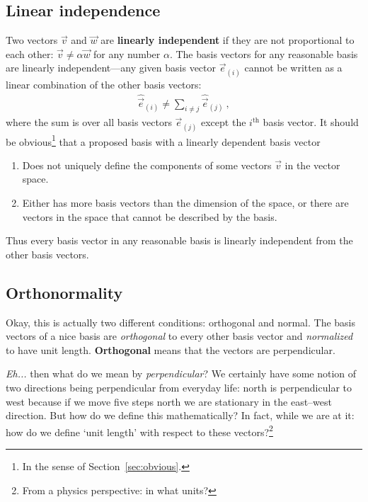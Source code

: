 \documentclass[
  11pt,
	colorful,
	raggedright,
]{tufte-style-thesis-flip}
\begin{document}
\subsection{Linear independence}

Two vectors $\vec{v}$ and $\vec{w}$ are \textbf{linearly independent} if they are not proportional to each other: $\vec{v} \neq \alpha \vec{w}$ for any number $\alpha$. The basis vectors for any reasonable basis are linearly independent---any given basis vector $\vec{e}_{(i)}$ cannot be written as a linear combination of the other basis vectors:
\begin{align}
\hat{\vec{e}}_{(i)} \neq \sum_{i\neq j}\hat{\vec{e}}_{(j)} \ ,
\end{align}
where the sum is over all basis vectors $\vec{e}_{(j)}$ except the $i^\text{th}$ basis vector. It should be obvious\footnote{In the sense of Section~\ref{sec:obvious}.} that a proposed basis with a linearly dependent basis vector
\begin{enumerate}
  \item Does not uniquely define the components of some vectors $\vec{v}$ in the vector space.
  \item Either has more basis vectors than the dimension of the space, or there are vectors in the space that cannot be described by the basis.
\end{enumerate}
Thus every basis vector in any reasonable basis is linearly independent from the other basis vectors.

\subsection{Orthonormality}

Okay, this is actually two different conditions: orthogonal and normal. The basis vectors of a nice basis are \emph{orthogonal} to every other basis vector and \emph{normalized} to have unit length. \textbf{Orthogonal} means that the vectors are perpendicular. 

\emph{Eh...} then what do we mean by \emph{perpendicular}? We certainly have some notion of two directions being perpendicular from everyday life: north is perpendicular to west because if we move five steps north we are stationary in the east--west direction. But how do we define this mathematically? In fact, while we are at it: how do we define `unit length' with respect to these vectors?\footnote{From a physics perspective: in what units?} 
\end{document}
